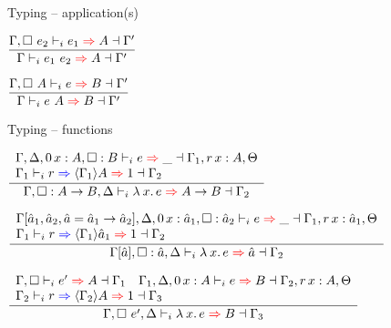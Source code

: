 \documentclass{beamer}
\begin{document}
\begin{frame}{Typing -- application(s)}

\begin{center}
  $\infrule{\infer{\Gamma, \arghint{e_2}}{e_1}{A}{\Gamma'}}{\infer{\Gamma}{\app{e_1}{e_2}}{A}{\Gamma'}}$

  \vspace{2em}

  $\infrule{\infer{\Gamma, \typearghint{A}}{e}{B}{\Gamma'}}{\infer{\Gamma}{\app{e}{A}}{B}{\Gamma'}}$
\end{center}

\end{frame}

\begin{frame}{Typing -- functions}

\begin{center}
  $\infrule{\begin{array}{l} \infer{\Gamma, \Delta, \var[\Zero]{x}{A}, \typehint{B}}{e}{\_}{\Gamma_1, \var[r]{x}{A}, \Theta} \\ \newkinding{\Gamma_1}{r}{\substctx{\Gamma_1}{A}}{\One}{\Gamma_2} \end{array}}{\infer{\Gamma, \typehint{\Fun{A}{B}}, \Delta}{\fun{x}{e}}{\Fun{A}{B}}{\Gamma_2}}$

  \vspace{1em}

  $\infrule{\begin{array}{l} \infer{\holectx{\Gamma}{\evar{a}_1, \evar{a}_2, \evar{a}[\Fun{\evar{a}_1}{\evar{a}_2}]}, \Delta, \var[\Zero]{x}{\evar{a}_1}, \typehint{\evar{a}_2}}{e}{\_}{\Gamma_1, \var[r]{x}{\evar{a}_1}, \Theta} \\ \newkinding{\Gamma_1}{r}{\substctx{\Gamma_1}{\evar{a}_1}}{\One}{\Gamma_2} \end{array}}{\infer{\holectx{\Gamma}{\evar{a}}, \typehint{\evar{a}}, \Delta}{\fun{x}{e}}{\evar{a}}{\Gamma_2}}$

  \vspace{1em}

  $\infrule{\begin{array}{l} \infer{\Gamma, \emptyhint}{e'}{A}{\Gamma_1} \quad \infer{\Gamma_1, \Delta, \var[\Zero]{x}{A}}{e}{B}{\Gamma_2, \var[r]{x}{A}, \Theta} \\ \newkinding{\Gamma_2}{r}{\substctx{\Gamma_2}{A}}{\One}{\Gamma_3} \end{array}}{\infer{\Gamma, \arghint{e'}, \Delta}{\fun{x}{e}}{B}{\Gamma_3}}$

  \vspace{1em}


\end{center}
\end{frame}
\end{document}
